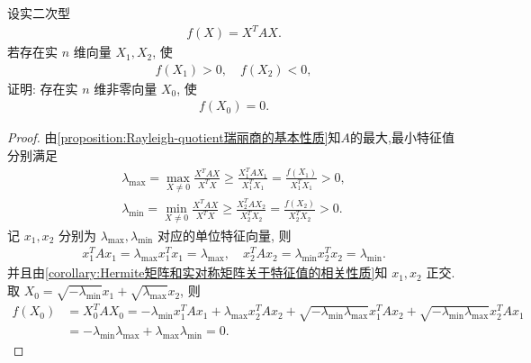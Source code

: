 \documentclass[../../main.tex]{subfiles}%
\begin{document}
\begin{example}
设实二次型
\begin{align*}
f(X) = X^T A X.
\end{align*}
若存在实 $n$ 维向量 $X_1, X_2$, 使
\begin{align*}
f(X_1) > 0, \quad f(X_2) < 0,
\end{align*}
证明: 存在实 $n$ 维非零向量 $X_0$, 使
\begin{align*}
f(X_0) = 0.
\end{align*}
\end{example}
\begin{proof}
由\cref{proposition:Rayleigh-quotient瑞丽商的基本性质}知$A$的最大,最小特征值分别满足
\begin{align*}
\lambda_{\max}=\max\limits_{X\ne 0}\frac{X^TAX}{X^TX}\geqslant \frac{X_1^TAX_1}{X_1^TX_1}=\frac{f(X_1)}{X_1^TX_1}>0, \\
\lambda_{\min}=\min\limits_{X\ne 0}\frac{X^TAX}{X^TX}\geqslant \frac{X_2^TAX_2}{X_2^TX_2}=\frac{f(X_2)}{X_2^TX_2}>0.
\end{align*}
记 $x_1, x_2$ 分别为 $\lambda_{\max}, \lambda_{\min}$ 对应的单位特征向量, 则
\begin{align*}
x_1^TAx_1=\lambda_{\max}x_1^Tx_1=\lambda_{\max},\quad x_2^TAx_2=\lambda_{\min}x_2^Tx_2=\lambda_{\min}.
\end{align*}
并且由\cref{corollary:Hermite矩阵和实对称矩阵关于特征值的相关性质}知 $x_1, x_2$ 正交. 取 $X_0=\sqrt{-\lambda_{\min}}x_1+\sqrt{\lambda_{\max}}x_2$, 则
\begin{align*}
f(X_0) &= X_0^TAX_0=-\lambda_{\min}x_1^TAx_1+\lambda_{\max}x_2^TAx_2+\sqrt{-\lambda_{\min}\lambda_{\max}}x_1^TAx_2+\sqrt{-\lambda_{\min}\lambda_{\max}}x_2^TAx_1 \\
&= -\lambda_{\min}\lambda_{\max}+\lambda_{\max}\lambda_{\min}=0.
\end{align*}
\end{proof}
\end{document}
